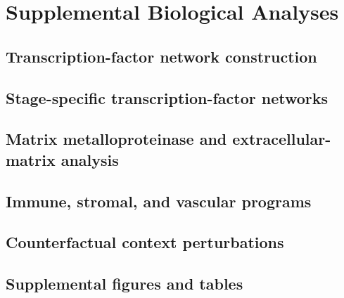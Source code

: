 \chapter{Supplemental Biological Analyses} \label{chap:appendix-biology}

\section{Transcription-factor network construction}


\section{Stage-specific transcription-factor networks}


\section{Matrix metalloproteinase and extracellular-matrix analysis}


\section{Immune, stromal, and vascular programs}


\section{Counterfactual context perturbations}


\section{Supplemental figures and tables}

